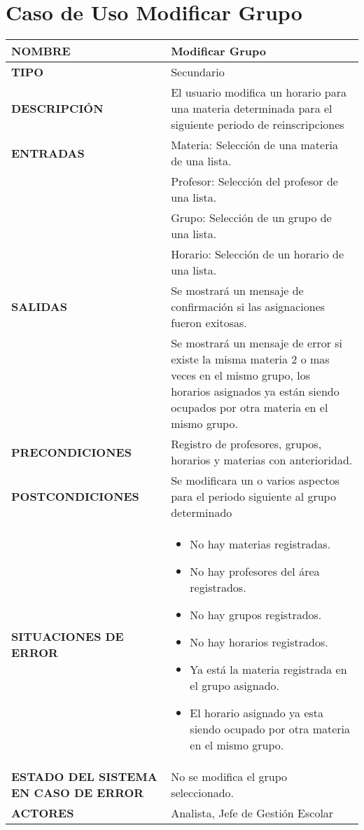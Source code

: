 \newpage
\section{Caso de Uso Modificar Grupo}
\begin{longtable}{ | p{6cm} | p{10cm} |}
\hline
\textbf{NOMBRE} & Modificar Grupo\\
\hline
\textbf{TIPO} & Secundario\\
\hline
\textbf{DESCRIPCIÓN} & El usuario modifica un horario para una materia determinada para el siguiente periodo de reinscripciones\\
\hline
\textbf{ENTRADAS} & Materia: Selección de una materia de una lista.\\ & Profesor: Selección del profesor de una lista.\\ & Grupo: Selección de un grupo de una lista.\\ & Horario: Selección de un horario de una lista.\\
\hline
\textbf{SALIDAS} & Se mostrará un mensaje de confirmación si las asignaciones fueron exitosas.\\ & Se mostrará un mensaje de error si existe la misma materia 2 o mas veces en el mismo grupo, los horarios asignados ya están siendo ocupados por otra materia en el mismo grupo.\\
\hline
\textbf{PRECONDICIONES} & Registro de profesores, grupos, horarios y materias con anterioridad.\\
\hline
\textbf{POSTCONDICIONES} & Se modificara un o varios aspectos para el periodo siguiente al grupo determinado\\
\hline
\textbf{SITUACIONES DE ERROR} & \begin{itemize}
    \item No hay materias registradas.
    \item No hay profesores del área registrados.
    \item No hay grupos registrados.
    \item No hay horarios registrados.
    \item Ya está la materia registrada en el grupo asignado.
    \item El horario asignado ya esta siendo ocupado por otra materia en el mismo grupo.
\end{itemize}\\
\hline
\textbf{ESTADO DEL SISTEMA EN CASO DE ERROR} & No se modifica el grupo seleccionado.\\
\hline
\textbf{ACTORES} & Analista, Jefe de Gestión Escolar\\
\hline
\end{longtable}
